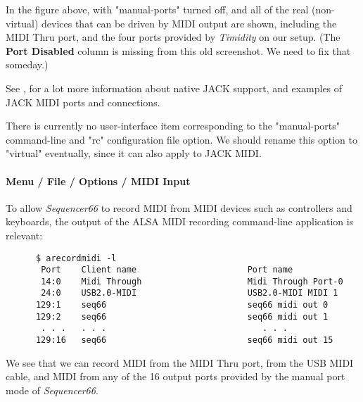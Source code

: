    In the figure above, with "manual-ports" turned off, and
   all of the real (non-virtual) devices that can be driven by MIDI output are
   shown, including the MIDI Thru port, and
   the four ports provided by \textsl{Timidity} on our setup.
   (The \textbf{Port Disabled} column is missing from this old screenshot.  We
   need to fix that someday.)

   See ,
   for a lot more information about native JACK support, and examples of JACK
   MIDI ports and connections.

   There is currently no user-interface item corresponding to the "manual-ports"
   command-line and "rc" configuration file option.
   We should rename this option to "virtual"
   eventually, since it can also apply to JACK MIDI.

\paragraph{Menu / File / Options / MIDI Input}
\label{paragraph:seq66_menu_file_options_midi_input}

   To allow \textsl{Sequencer66} to record MIDI from MIDI devices such as
   controllers and keyboards, the output of the ALSA MIDI recording
   command-line application is relevant:

   \begin{verbatim}
      $ arecordmidi -l
       Port    Client name                      Port name
       14:0    Midi Through                     Midi Through Port-0
       24:0    USB2.0-MIDI                      USB2.0-MIDI MIDI 1
      129:1    seq66                            seq66 midi out 0
      129:2    seq66                            seq66 midi out 1
       . . .   . . .                               . . .
      129:16   seq66                            seq66 midi out 15
   \end{verbatim}


   We see that we can record MIDI from the MIDI Thru port, from the USB MIDI
   cable, and MIDI from any of the 16 output ports provided by the manual
   port mode of \textsl{Sequencer66}.

